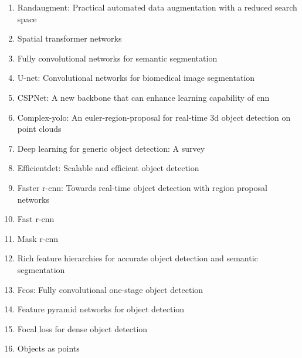 \documentclass[acmlarge]{acmart}
\begin{document}
\begin{enumerate}
	\item Randaugment: Practical automated data augmentation with a reduced search space \cite{cubuk2020randaugment} 

	\item Spatial transformer networks \cite{jaderberg2015spatial} 

	\item Fully convolutional networks for semantic segmentation \cite{long2015fully} 

	\item U-net: Convolutional networks for biomedical image segmentation \cite{ronneberger2015u} 

	\item CSPNet: A new backbone that can enhance learning capability of cnn \cite{wang2020cspnet} 

	\item Complex-yolo: An euler-region-proposal for real-time 3d object detection on point clouds \cite{simony2018complex} 

	\item Deep learning for generic object detection: A survey \cite{liu2020deep} 

	\item Efficientdet: Scalable and efficient object detection \cite{tan2020efficientdet} 

	\item Faster r-cnn: Towards real-time object detection with region proposal networks \cite{ren2015faster} 

	\item Fast r-cnn \cite{girshick2015fast} 

	\item Mask r-cnn \cite{he2017mask} 

	\item Rich feature hierarchies for accurate object detection and semantic segmentation \cite{girshick2014rich} 

	\item Fcos: Fully convolutional one-stage object detection \cite{tian2019fcos} 

	\item Feature pyramid networks for object detection \cite{lin2017feature} 

	\item Focal loss for dense object detection \cite{lin2017focal} 

	\item Objects as points \cite{zhou2019objects} 


\end{enumerate}
\end{document}

